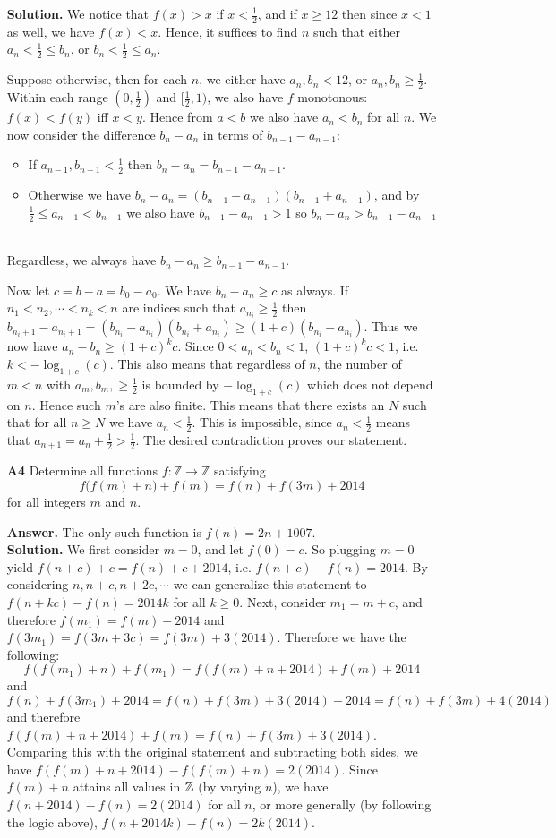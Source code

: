 \documentclass[11pt,a4paper]{article}
\begin{document}
\begin{enumerate}
	\textbf{Solution.} We notice that $f(x)>x$ if $x<\frac 12$, and if $x\ge 12$ then since $x<1$ as well, we have $f(x)<x$. Hence, it suffices to find $n$ such that either $a_n<\frac 12\le b_n$, or $b_n<\frac 12 \le a_n$. 
	
	Suppose otherwise, then for each $n$, we either have $a_n, b_n < 12$, or $a_n, b_n\ge\frac 12$. 
	Within each range $(0, \frac 12)$ and $[\frac 12, 1)$, we also have $f$ monotonous: $f(x)<f(y)$ iff $x<y$. 
	Hence from $a<b$ we also have $a_n<b_n$ for all $n$. We now consider the difference $b_n-a_n$ in terms of $b_{n-1}-a_{n-1}$: 
	\begin{itemize}
		\item If $a_{n-1}, b_{n-1}<\frac 12$ then $b_n-a_n=b_{n-1}-a_{n-1}$. 
		
		\item Otherwise we have $b_n-a_n = (b_{n-1}-a_{n-1})(b_{n-1}+a_{n-1})$, and by $\frac 12\le a_{n-1}<b_{n-1}$ we also have $b_{n-1}-a_{n-1}>1$ so $b_n-a_n>b_{n-1}-a_{n-1}$. 
	\end{itemize}
	Regardless, we always have $b_n-a_n \ge b_{n-1} - a_{n-1}$. 
	
	Now let $c=b-a=b_0-a_0$. We have $b_{n}-a_{n}\ge c$ as always. If $n_1< n_2, \cdots < n_k<n$ are indices such that $a_{n_i}\ge\frac 12$ then $b_{n_i+1}-a_{n_i+1} = (b_{n_i} - a_{n_i})(b_{n_i} + a_{n_i})\ge (1+c)(b_{n_i}-a_{n_i})$. Thus we now have $a_n-b_n\ge (1+c)^{k}c$. 
	Since $0< a_n<b_n<1$, $(1+c)^kc<1$, i.e. $k<-\log_{1+c}(c)$. 
	This also means that regardless of $n$, the number of $m<n$ with $a_m, b_m,\ge \frac 12$ is bounded by $-\log_{1+c}(c)$ which does not depend on $n$. Hence such $m$'s are also finite. 
	This means that there exists an $N$ such that for all $n\ge N$ we have $a_n<\frac 12$. This is impossible, since $a_n<\frac 12$ means that $a_{n+1}=a_n+\frac 12>\frac 12$. The desired contradiction proves our statement. 
	
	\item[\textbf{A4}] Determine all functions $f: \mathbb{Z}\to\mathbb{Z}$ satisfying \[f\big(f(m)+n\big)+f(m)=f(n)+f(3m)+2014\] for all integers $m$ and $n$.
	
	\textbf{Answer.} The only such function is $f(n)=2n+1007$. \\
	\textbf{Solution.} We first consider $m=0$, and let $f(0)=c$. So plugging $m=0$ yield $f(n+c)+c=f(n)+c+2014$, i.e. $f(n+c)-f(n)=2014$. By considering $n, n+c, n+2c, \cdots$ we can generalize this statement to $f(n+kc)-f(n)=2014k$ for all $k\ge 0$. 
	Next, consider $m_1=m+c$, and therefore $f(m_1)=f(m)+2014$ and $f(3m_1)=f(3m+3c)=f(3m)+3(2014)$. 
	Therefore we have the following: 
	\[f(f(m_1)+n)+f(m_1)=f(f(m)+n+2014)+f(m)+2014\]
	and
	\[
	f(n)+f(3m_1)+2014=f(n)+f(3m)+3(2014)+2014=f(n)+f(3m)+4(2014)
	\]
	and therefore $f(f(m)+n+2014)+f(m)=f(n)+f(3m)+3(2014)$. Comparing this with the original statement and subtracting both sides, we have $f(f(m)+n+2014)-f(f(m)+n)=2(2014)$. Since $f(m)+n$ attains all values in $\mathbb{Z}$ (by varying $n$), we have $f(n+2014)-f(n)=2(2014)$ for all $n$, or more generally (by following the logic above), $f(n+2014k)-f(n)=2k(2014)$. 
	

\end{enumerate}
\end{document}
